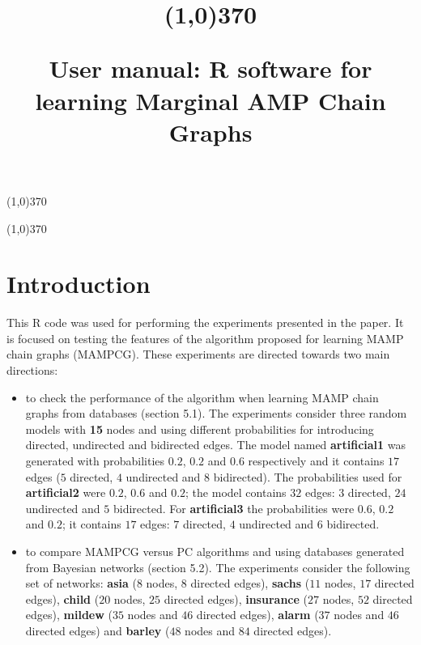 \documentclass[11pt,professionalfont]{article}
\title{\vspace{-3cm}\begin{center} \line(1,0){370} \\\vspace{0.5cm} \end{center}
User manual: R software for learning Marginal AMP Chain Graphs}
\begin{document}
\maketitle
\vspace{-1.5cm}
\begin{center} \line(1,0){370} \end{center}
\vspace{0.5cm}
\tableofcontents
\begin{center} \line(1,0){370} \end{center}

\section{Introduction}

This R code was used for performing the experiments presented in the
paper. It is focused on testing the features of the algorithm proposed
for learning MAMP chain graphs (MAMPCG). These experiments are directed 
towards two main directions:

\begin{itemize}
\item to check the performance of the algorithm when learning MAMP chain 
graphs from databases (section 5.1). The experiments consider three random 
models with \textbf{15} nodes and using different probabilities for introducing 
directed, undirected and bidirected edges. The model named \textbf{artificial1} 
was generated with probabilities $0.2$, $0.2$ and $0.6$ respectively and it 
contains $17$ edges ($5$ directed, $4$ undirected and $8$ bidirected). The 
probabilities used for \textbf{artificial2} were $0.2$, $0.6$ and $0.2$; the 
model contains $32$ edges: $3$ directed, $24$ undirected and $5$ bidirected. 
For \textbf{artificial3} the probabilities were $0.6$, $0.2$ and $0.2$; it 
contains $17$ edges: $7$ directed, $4$ undirected and $6$ bidirected.

\item to compare MAMPCG versus PC algorithms and using databases generated 
from Bayesian networks (section 5.2). The experiments consider the following 
set of networks: \textbf{asia} ($8$ nodes, $8$ directed edges), \textbf{sachs} 
($11$ nodes, $17$ directed edges), \textbf{child} ($20$ nodes,  $25$ directed 
edges), \textbf{insurance} ($27$ nodes, $52$ directed edges), \textbf{mildew} 
($35$ nodes and $46$ directed edges), \textbf{alarm} ($37$ nodes and $46$ 
directed edges) and \textbf{barley} ($48$ nodes and $84$ directed edges).
\end{itemize}
\end{document}
